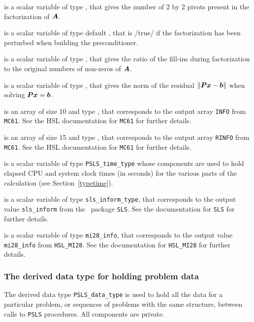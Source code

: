 \documentclass{galahad}
\newcommand{\packagename}{PSLS}
\begin{document}
\begin{description}
 is a scalar variable of type \integer,
that gives the number of 2 by 2 pivots present in the factorization
of ${\bm{A}}$.

 is a scalar variable of type default \logical,
that is /true/ if the factorization has been perturbed when building the
preconditioner.

 is a scalar variable of type \realdp,
that gives the ratio of the fill-ins during factorization to the
original numbers of non-zeros of ${\bm{A}}$.

 is a scalar variable of type \realdp,
that gives the norm of the residual $\|{\bm{P}} {\bm{x}} - {\bm{b}}\|$
when solving ${\bm{P}} {\bm{x}} = {\bm{b}}$.

 is an array of size 10 and type \integer,
that corresponds to the output array {\tt INFO}
from {\tt MC61}. See the HSL documentation for {\tt MC61} for further
details.

 is an array of size 15 and type \realdp,
that corresponds to the output array {\tt RINFO}
from {\tt MC61}. See the HSL documentation for {\tt MC61} for further
details.

 is a scalar variable of type {\tt \packagename\_time\_type}
whose components are used to hold elapsed CPU and system clock times
(in seconds) for the various parts of the calculation
(see Section~\ref{typetime}).

 is a scalar variable of type {\tt sls\_inform\_type},
that corresponds to the output value {\tt sls\_inform} from the \libraryname\ 
package {\tt SLS}. See the documentation for {\tt SLS} for further details.

 is a scalar variable of type {\tt mi28\_info},
that corresponds to the output value {\tt mi28\_info}
from {\tt HSL\_MI28}. See the documentation for {\tt HSL\_MI28} for further
details.

\end{description}



\subsubsection{The derived data type for holding problem data}\label{typedata}
The derived data type
{\tt \packagename\_data\_type}
is used to hold all the data for a particular problem,
or sequences of problems with the same structure, between calls to
{\tt \packagename} procedures.
All components are private.
\end{document}
